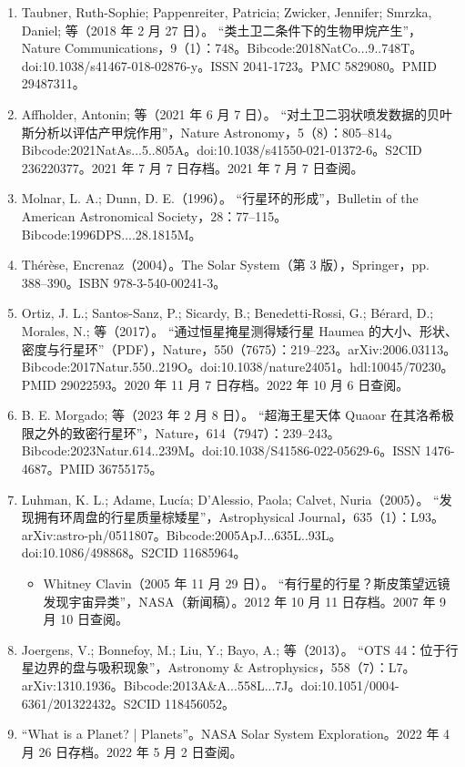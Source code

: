 \begin{enumerate}
\item Taubner, Ruth-Sophie; Pappenreiter, Patricia; Zwicker, Jennifer; Smrzka, Daniel; 等（2018 年 2 月 27 日）。
“类土卫二条件下的生物甲烷产生”，Nature Communications，9（1）：748。Bibcode:2018NatCo...9..748T。doi:10.1038/s41467-018-02876-y。ISSN 2041-1723。PMC 5829080。PMID 29487311。
\item Affholder, Antonin; 等（2021 年 6 月 7 日）。
“对土卫二羽状喷发数据的贝叶斯分析以评估产甲烷作用”，Nature Astronomy，5（8）：805–814。Bibcode:2021NatAs...5..805A。doi:10.1038/s41550-021-01372-6。S2CID 236220377。2021 年 7 月 7 日存档。2021 年 7 月 7 日查阅。
\item Molnar, L. A.; Dunn, D. E.（1996）。 “行星环的形成”，Bulletin of the American Astronomical Society，28：77–115。Bibcode:1996DPS....28.1815M。
\item Thérèse, Encrenaz（2004）。The Solar System（第 3 版），Springer，pp. 388–390。ISBN 978-3-540-00241-3。
\item Ortiz, J. L.; Santos-Sanz, P.; Sicardy, B.; Benedetti-Rossi, G.; Bérard, D.; Morales, N.; 等（2017）。
“通过恒星掩星测得矮行星 Haumea 的大小、形状、密度与行星环”（PDF），Nature，550（7675）：219–223。arXiv:2006.03113。Bibcode:2017Natur.550..219O。doi:10.1038/nature24051。hdl:10045/70230。PMID 29022593。2020 年 11 月 7 日存档。2022 年 10 月 6 日查阅。
\item B. E. Morgado; 等（2023 年 2 月 8 日）。
“超海王星天体 Quaoar 在其洛希极限之外的致密行星环”，Nature，614（7947）：239–243。Bibcode:2023Natur.614..239M。doi:10.1038/S41586-022-05629-6。ISSN 1476-4687。PMID 36755175。
\item Luhman, K. L.; Adame, Lucía; D'Alessio, Paola; Calvet, Nuria（2005）。
“发现拥有环周盘的行星质量棕矮星”，Astrophysical Journal，635（1）：L93。arXiv:astro-ph/0511807。Bibcode:2005ApJ...635L..93L。doi:10.1086/498868。S2CID 11685964。
\begin{itemize}
\item Whitney Clavin（2005 年 11 月 29 日）。
“有行星的行星？斯皮策望远镜发现宇宙异类”，NASA（新闻稿）。2012 年 10 月 11 日存档。2007 年 9 月 10 日查阅。
\end{itemize}
\item Joergens, V.; Bonnefoy, M.; Liu, Y.; Bayo, A.; 等（2013）。
“OTS 44：位于行星边界的盘与吸积现象”，Astronomy & Astrophysics，558（7）：L7。arXiv:1310.1936。Bibcode:2013A&A...558L...7J。doi:10.1051/0004-6361/201322432。S2CID 118456052。
\item “What is a Planet? | Planets”。NASA Solar System Exploration。2022 年 4 月 26 日存档。2022 年 5 月 2 日查阅。

\end{enumerate}
